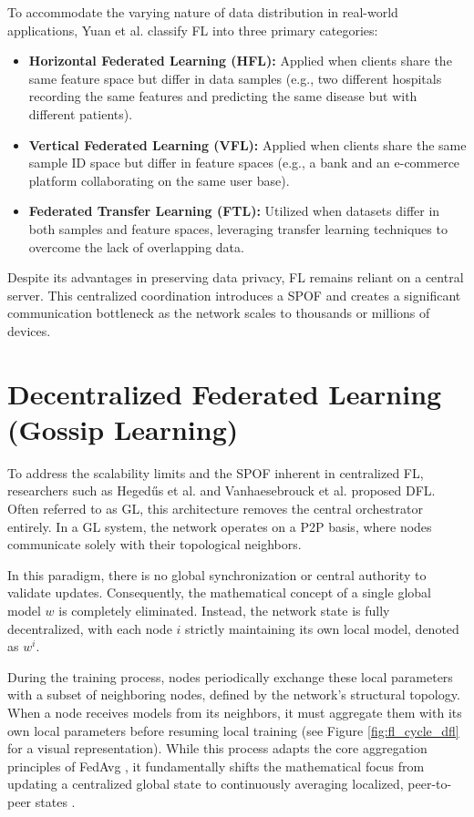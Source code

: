 To accommodate the varying nature of data distribution in real-world applications, Yuan et al. \cite{yuan2024decentralized} classify FL into three primary categories:

\begin{itemize}
    \item \textbf{Horizontal Federated Learning (HFL):} Applied when clients share the same feature space but differ in data samples (e.g., two different hospitals recording the same features and predicting the same disease but with different patients).
    \item \textbf{Vertical Federated Learning (VFL):} Applied when clients share the same sample ID space but differ in feature spaces (e.g., a bank and an e-commerce platform collaborating on the same user base).
    \item \textbf{Federated Transfer Learning (FTL):} Utilized when datasets differ in both samples and feature spaces, leveraging transfer learning techniques to overcome the lack of overlapping data.
\end{itemize}

Despite its advantages in preserving data privacy, FL remains reliant on a central server. This centralized coordination introduces a SPOF and creates a significant communication bottleneck as the network scales to thousands or millions of devices. 

\section{Decentralized Federated Learning (Gossip Learning)} \label{sec:DFL}

To address the scalability limits and the SPOF inherent in centralized FL, researchers such as Hegedűs et al. \cite{hegedus2019gossip} and Vanhaesebrouck et al. \cite{vanhaesebrouck2017decentralized} proposed DFL. Often referred to as GL, this architecture removes the central orchestrator entirely. In a GL system, the network operates on a P2P basis, where nodes communicate solely with their topological neighbors.

In this paradigm, there is no global synchronization or central authority to validate updates. Consequently, the mathematical concept of a single global model $w$ is completely eliminated. Instead, the network state is fully decentralized, with each node $i$ strictly maintaining its own local model, denoted as $w^i$. 

During the training process, nodes periodically exchange these local parameters with a subset of neighboring nodes, defined by the network's structural topology. When a node receives models from its neighbors, it must aggregate them with its own local parameters before resuming local training (see Figure \ref{fig:fl_cycle_dfl} for a visual representation). While this process adapts the core aggregation principles of FedAvg \cite{mcmahan2017communication}, it fundamentally shifts the mathematical focus from updating a centralized global state to continuously averaging localized, peer-to-peer states \cite{yuan2024decentralized}.

